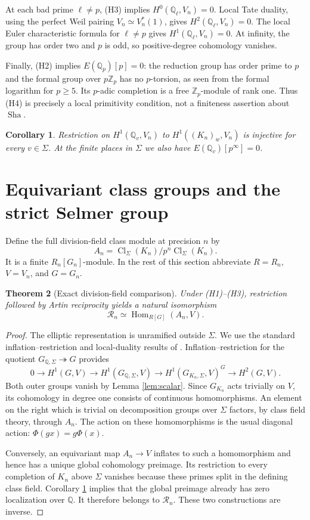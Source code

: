 \documentclass[11pt,a4paper]{article}
\newtheorem{theorem}{Theorem}[section]
\newtheorem{corollary}[theorem]{Corollary}
\theoremstyle{definition}\newtheorem{definition}[theorem]{Definition}
\theoremstyle{remark}\newtheorem{remark}[theorem]{Remark}
\newcommand{\Sha}{\operatorname{\mathrm{Sha}}}\newcommand{\ZZ}{\mathbb Z}\newcommand{\QQ}{\mathbb Q}\newcommand{\FF}{\mathbb F}\newcommand{\Gal}{\operatorname{Gal}}\newcommand{\Hom}{\operatorname{Hom}}\newcommand{\End}{\operatorname{End}}\newcommand{\Cl}{\operatorname{Cl}}\newcommand{\Sel}{\operatorname{Sel}}\newcommand{\rk}{\operatorname{rank}}\newcommand{\corank}{\operatorname{corank}}\newcommand{\ord}{\operatorname{ord}}\newcommand{\im}{\operatorname{im}}\newcommand{\length}{\operatorname{length}}\newcommand{\GL}{\operatorname{GL}}\newcommand{\NS}{\operatorname{NS}}\newcommand{\Br}{\operatorname{Br}}\newcommand{\Pic}{\operatorname{Pic}}\newcommand{\Sym}{\operatorname{Sym}}\newcommand{\R}{\mathcal R}\newcommand{\A}{\mathcal A}\newcommand{\D}{\mathcal D}\newcommand{\W}{\mathscr W}\newcommand{\Y}{\mathscr Y}\newcommand{\I}{\mathfrak I}
\numberwithin{equation}{section}
\begin{document}
At each bad prime $\ell\ne p$, (H3) implies $H^0(\QQ_\ell,V_n)=0$. Local Tate duality, using the perfect Weil pairing $V_n\simeq V_n^*(1)$, gives $H^2(\QQ_\ell,V_n)=0$. The local Euler characteristic formula for $\ell\ne p$ gives $H^1(\QQ_\ell,V_n)=0$. At infinity, the group has order two and $p$ is odd, so positive-degree cohomology vanishes.

Finally, (H2) implies $E(\QQ_p)[p]=0$: the reduction group has order prime to $p$ and the formal group over $p\ZZ_p$ has no $p$-torsion, as seen from the formal logarithm for $p\ge5$. Its $p$-adic completion is a free $\ZZ_p$-module of rank one. Thus (H4) is precisely a local primitivity condition, not a finiteness assertion about $\Sha$.

\begin{corollary}\label{cor:local}
Restriction on $H^1(\QQ_v,V_n)$ to $H^1((K_n)_w,V_n)$ is injective for every $v\in\Sigma$. At the finite places in $\Sigma$ we also have $E(\QQ_v)[p^\infty]=0$.
\end{corollary}


\section{Equivariant class groups and the strict Selmer group}
Define the full division-field class module at precision $n$ by
\[
A_n=\Cl_\Sigma(K_n)/p^n\Cl_\Sigma(K_n).
\]
It is a finite $R_n[G_n]$-module. In the rest of this section abbreviate $R=R_n$, $V=V_n$, and $G=G_n$.

\begin{theorem}[Exact division-field comparison]\label{th:full}
Under (H1)--(H3), restriction followed by Artin reciprocity yields a natural isomorphism
\begin{equation}\label{eq:full}
\R_n\simeq\Hom_{R[G]}(A_n,V).
\end{equation}
\end{theorem}
\begin{proof}
The elliptic representation is unramified outside $\Sigma$. We use the standard inflation--restriction and local-duality results of \cite{NSW,Serre}. Inflation--restriction for the quotient $G_{\QQ,\Sigma}\twoheadrightarrow G$ provides
\[
0\to H^1(G,V)\to H^1(G_{\QQ,\Sigma},V)
\to H^1(G_{K_n,\Sigma},V)^G\to H^2(G,V).
\]
Both outer groups vanish by Lemma \ref{lem:scalar}. Since $G_{K_n}$ acts trivially on $V$, its cohomology in degree one consists of continuous homomorphisms. An element on the right which is trivial on decomposition groups over $\Sigma$ factors, by class field theory, through $A_n$. The action on these homomorphisms is the usual diagonal action: $\Phi(gx)=g\Phi(x)$.

Conversely, an equivariant map $A_n\to V$ inflates to such a homomorphism and hence has a unique global cohomology preimage. Its restriction to every completion of $K_n$ above $\Sigma$ vanishes because these primes split in the defining class field. Corollary \ref{cor:local} implies that the global preimage already has zero localization over $\QQ$. It therefore belongs to $\R_n$. These two constructions are inverse.
\end{proof}
\end{document}
